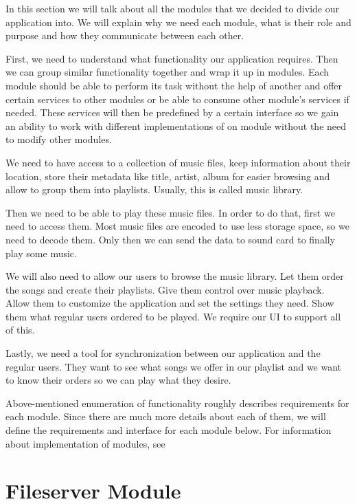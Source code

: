In this section we will talk about all the modules that we decided to divide our application into. We will explain why we need each module, what is their role and purpose and how they communicate between each other.
\par
First, we need to understand what functionality our application requires. Then we can group similar functionality together and wrap it up in modules. Each module should be able to perform its task without the help of another and offer certain services to other modules or be able to consume other module's services if needed. These services will then be predefined by a certain interface so we gain an ability to work with different implementations of on module without the need to modify other modules.
\par
We need to have access to a collection of music files, keep information about their location, store their metadata like title, artist, album for easier browsing and allow to group them into playlists. Usually, this is called music library.
\par
Then we need to be able to play these music files. In order to do that, first we need to access them. Most music files are encoded to use less storage space, so we need to decode them. Only then we can send the data to sound card to finally play some music.
\par
We will also need to allow our users to browse the music library. Let them order the songs and create their playlists. Give them control over music playback. Allow them to customize the application and set the settings they need. Show them what regular users ordered to be played. We require our UI to support all of this.
\par
Lastly, we need a tool for synchronization between our application and the regular users. They want to see what songs we offer in our playlist and we want to know their orders so we can play what they desire.
\par
Above-mentioned enumeration of functionality roughly describes requirements for each module. Since there are much more details about each of them, we will define the requirements and interface for each module below. For information about implementation of modules, see 

\section{Fileserver Module}

